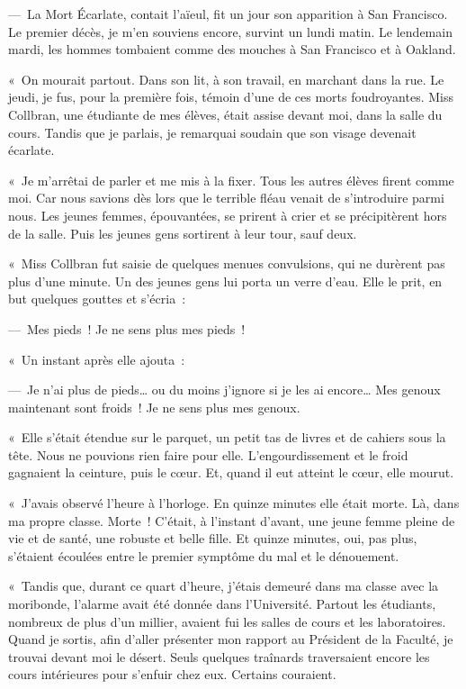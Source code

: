 \documentclass[french,twoside]{book} %
\begin{document}
— La Mort Écarlate, contait l’aïeul, fit un jour son apparition à San Francisco. Le premier décès, je m’en souviens encore, survint un lundi matin. Le lendemain mardi, les hommes tombaient comme des mouches à San Francisco et à Oakland.\par
« On mourait partout. Dans son lit, à son travail, en marchant dans la rue. Le jeudi, je fus, pour la première fois, témoin d’une de ces morts foudroyantes. Miss Collbran, une étudiante de mes élèves, était assise devant moi, dans la salle du cours. Tandis que je parlais, je remarquai soudain que son visage devenait écarlate.\par
« Je m’arrêtai de parler et me mis à la fixer. Tous les autres élèves firent comme moi. Car nous savions dès lors que le terrible fléau venait de s’introduire parmi nous. Les jeunes femmes, épouvantées, se prirent à crier et se précipitèrent hors de la salle. Puis les jeunes gens sortirent à leur tour, sauf deux.\par
« Miss Collbran fut saisie de quelques menues convulsions, qui ne durèrent pas plus d’une minute. Un des jeunes gens lui porta un verre d’eau. Elle le prit, en but quelques gouttes et s’écria :\par
— Mes pieds ! Je ne sens plus mes pieds !\par
« Un instant après elle ajouta :\par
— Je n’ai plus de pieds… ou du moins j’ignore si je les ai encore… Mes genoux maintenant sont froids ! Je ne sens plus mes genoux.\par
« Elle s’était étendue sur le parquet, un petit tas de livres et de cahiers sous la tête. Nous ne pouvions rien faire pour elle. L’engourdissement et le froid gagnaient la ceinture, puis le cœur. Et, quand il eut atteint le cœur, elle mourut.\par
« J’avais observé l’heure à l’horloge. En quinze minutes elle était morte. Là, dans ma propre classe. Morte ! C’était, à l’instant d’avant, une jeune femme pleine de vie et de santé, une robuste et belle fille. Et quinze minutes, oui, pas plus, s’étaient écoulées entre le premier symptôme du mal et le dénouement.\par
« Tandis que, durant ce quart d’heure, j’étais demeuré dans ma classe avec la moribonde, l’alarme avait été donnée dans l’Université. Partout les étudiants, nombreux de plus d’un millier, avaient fui les salles de cours et les laboratoires. Quand je sortis, afin d’aller présenter mon rapport au Président de la Faculté, je trouvai devant moi le désert. Seuls quelques traînards traversaient encore les cours intérieures pour s’enfuir chez eux. Certains couraient.\par
\end{document}
